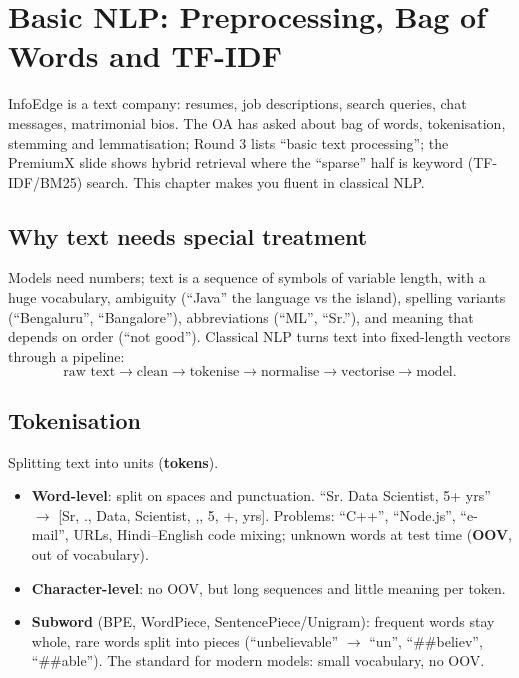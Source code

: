 \chapter{Basic NLP: Preprocessing, Bag of Words and TF-IDF}

InfoEdge is a text company: resumes, job descriptions, search queries, chat messages, matrimonial bios. The OA has asked about
bag of words, tokenisation, stemming and lemmatisation; Round 3 lists ``basic text processing''; the PremiumX slide shows hybrid
retrieval where the ``sparse'' half is keyword (TF-IDF/BM25) search. This chapter makes you fluent in classical NLP.

\section{Why text needs special treatment}
Models need numbers; text is a sequence of symbols of variable length, with a huge vocabulary, ambiguity (``Java'' the language
vs the island), spelling variants (``Bengaluru'', ``Bangalore''), abbreviations (``ML'', ``Sr.''), and meaning that depends on order
(``not good''). Classical NLP turns text into fixed-length vectors through a pipeline:
\[ \text{raw text}\to\text{clean}\to\text{tokenise}\to\text{normalise}\to\text{vectorise}\to\text{model}. \]

\section{Tokenisation}
Splitting text into units (\textbf{tokens}).
\begin{itemize}
\item \textbf{Word-level}: split on spaces and punctuation. ``Sr. Data Scientist, 5+ yrs'' $\to$ [Sr, ., Data, Scientist, ,, 5, +, yrs].
  Problems: ``C++'', ``Node.js'', ``e-mail'', URLs, Hindi--English code mixing; unknown words at test time (\textbf{OOV}, out of vocabulary).
\item \textbf{Character-level}: no OOV, but long sequences and little meaning per token.
\item \textbf{Subword} (BPE, WordPiece, SentencePiece/Unigram): frequent words stay whole, rare words split into pieces
  (``unbelievable'' $\to$ ``un'', ``\#\#believ'', ``\#\#able''). The standard for modern models: small vocabulary, no OOV.
\end{itemize}

